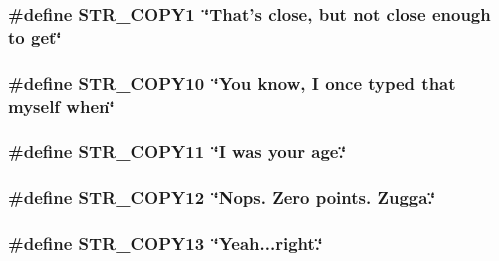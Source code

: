 \label{F__SPEAR_8H_abe171a6d9c08dad95fad9031de9656b2}
\hypertarget{F__SPEAR_8H_acd1ea4a1395a330839831fe06c62b8f8}{
\subsubsection[{STR\_\-COPY1}]{\setlength{\rightskip}{0pt plus 5cm}\#define STR\_\-COPY1~\char`\"{}That's close, but not close enough to get\char`\"{}}}
\label{F__SPEAR_8H_acd1ea4a1395a330839831fe06c62b8f8}
\hypertarget{F__SPEAR_8H_a9ab3d7b0b0aed9754f6acc5c13ce5827}{
\subsubsection[{STR\_\-COPY10}]{\setlength{\rightskip}{0pt plus 5cm}\#define STR\_\-COPY10~\char`\"{}You know, I once typed that myself when\char`\"{}}}
\label{F__SPEAR_8H_a9ab3d7b0b0aed9754f6acc5c13ce5827}
\hypertarget{F__SPEAR_8H_a174dd5ce83554e53b83780078229d011}{
\subsubsection[{STR\_\-COPY11}]{\setlength{\rightskip}{0pt plus 5cm}\#define STR\_\-COPY11~\char`\"{}I was your age.\char`\"{}}}
\label{F__SPEAR_8H_a174dd5ce83554e53b83780078229d011}
\hypertarget{F__SPEAR_8H_ac7b7617040a93c871a02cd3baf9d7fd3}{
\subsubsection[{STR\_\-COPY12}]{\setlength{\rightskip}{0pt plus 5cm}\#define STR\_\-COPY12~\char`\"{}Nops.  Zero points.  Zugga.\char`\"{}}}
\label{F__SPEAR_8H_ac7b7617040a93c871a02cd3baf9d7fd3}
\hypertarget{F__SPEAR_8H_a2ca7ffeb121c4599e89e9dc7d72c78cc}{
\subsubsection[{STR\_\-COPY13}]{\setlength{\rightskip}{0pt plus 5cm}\#define STR\_\-COPY13~\char`\"{}Yeah...right.\char`\"{}}}
